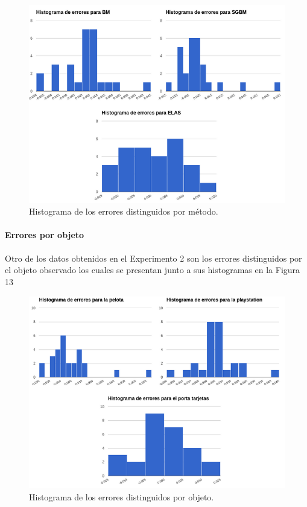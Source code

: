 \documentclass[11pt,a4paper,titlepage]{article}
\newcommand{\Figure}[1]{Figura #1}
\begin{document}

\begin{figure}[h!]

  \centering
    \includegraphics[width=1\textwidth]{f12.png}
  \caption{Histograma de los errores distinguidos por método.}
\end{figure}

\paragraph{Errores por objeto}
\hfill \break

Otro de los datos obtenidos en el Experimento 2 son los errores distinguidos por el objeto observado los cuales se presentan junto a sus histogramas en la \Figure{13}


\begin{figure}[h!]

  \centering
    \includegraphics[width=1\textwidth]{f13.png}
  \caption{Histograma de los errores distinguidos por objeto.}
\end{figure}
\end{document}
